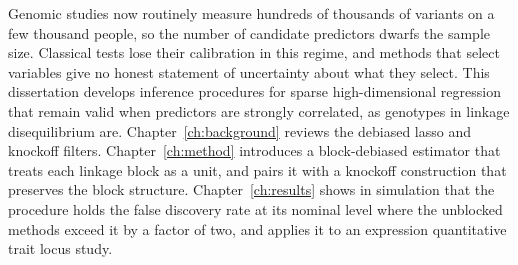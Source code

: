 Genomic studies now routinely measure hundreds of thousands of variants on a few thousand
people, so the number of candidate predictors dwarfs the sample size. Classical tests lose their
calibration in this regime, and methods that select variables give no honest statement of
uncertainty about what they select. This dissertation develops inference procedures for sparse
high-dimensional regression that remain valid when predictors are strongly correlated, as
genotypes in linkage disequilibrium are. Chapter~\ref{ch:background} reviews the debiased lasso
and knockoff filters. Chapter~\ref{ch:method} introduces a block-debiased estimator that
treats each linkage block as a unit, and pairs it with a knockoff construction that preserves
the block structure. Chapter~\ref{ch:results} shows in simulation that the procedure holds the
false discovery rate at its nominal level where the unblocked methods exceed it by a factor of
two, and applies it to an expression quantitative trait locus study.
